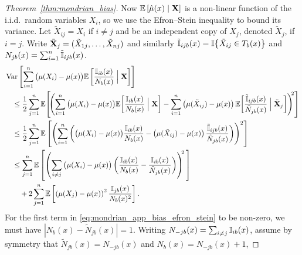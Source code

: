 \begin{proof}[Theorem~\ref{thm:mondrian_bias}]
  Now $\mathbb{E} \left[ \hat\mu(x) \mid \mathbf{X} \right]$
  is a non-linear function of the i.i.d.\ random variables $X_i$,
  so we use the Efron--Stein inequality
  \citep{efron1981jackknife} to bound its variance.
  Let $\tilde X_{i j} = X_i$ if $i \neq j$ and be an
  independent copy of $X_j$, denoted $\tilde X_j$, if $i = j$.
  Write $\tilde {\mathbf{X}}_j = (\tilde X_{1j}, \ldots, \tilde X_{n j})$
  and similarly
  $\tilde {\mathbb{I}}_{i j b}(x) = \mathbb{I} \big\{ \tilde X_{i j} \in T_b(x) \big\}$
  and $N_{j b}(x) = \sum_{i=1}^{n} \tilde {\mathbb{I}}_{i j b}(x)$.
  \begin{align}
    \nonumber
    &\Var \left[
      \sum_{i=1}^{n}
      \big( \mu(X_i) - \mu(x) \big)
      \E \left[
        \frac{\I_{i b}(x)}{N_b(x)}
        \Bigm| \bX
      \right]
    \right] \\
    \nonumber
    &\quad\leq
    \frac{1}{2}
    \sum_{j=1}^{n}
    \E \! \left[
      \! \left(
        \sum_{i=1}^{n}
        \big( \mu(X_i) - \mu(x) \big)
        \E \! \left[
          \frac{\I_{i b}(x)}{N_b(x)}
          \Bigm| \bX
        \right]
        - \sum_{i=1}^{n}
        \left( \mu(\tilde X_{i j}) - \mu(x) \right)
        \E \! \left[
          \frac{\tilde \I_{i j b}(x)}{\tilde N_{j b}(x)}
          \Bigm| \tilde \bX_j
        \right]
      \right)^{\! \! 2}
    \right] \\
    \nonumber
    &\quad\leq
    \frac{1}{2}
    \sum_{j=1}^{n}
    \E \left[
      \left(
        \sum_{i=1}^{n}
        \left(
          \big( \mu(X_i) - \mu(x) \big)
          \frac{\I_{i b}(x)}{N_b(x)}
          - \left( \mu(\tilde X_{i j}) - \mu(x) \right)
          \frac{\tilde \I_{i j b}(x)}{\tilde N_{j b}(x)}
        \right)
      \right)^2
    \right] \\
    \nonumber
    &\quad\leq
    \sum_{j=1}^{n}
    \E \left[
      \left(
        \sum_{i \neq j}
        \big( \mu(X_i) - \mu(x) \big)
        \left(
          \frac{\I_{i b}(x)}{N_b(x)} - \frac{\I_{i b}(x)}{\tilde N_{j b}(x)}
        \right)
      \right)^{\!\!2} \,
    \right] \\
    \label{eq:mondrian_app_bias_efron_stein}
    &\qquad+
    2 \sum_{j=1}^{n}
    \E \left[
      \left( \mu(X_j) - \mu(x) \right)^2
      \frac{\I_{j b}(x)}{N_b(x)^2}
    \right].
  \end{align}
  For the first term in \eqref{eq:mondrian_app_bias_efron_stein} to be non-zero,
  we must have $|N_b(x) - \tilde N_{j b}(x)| = 1$.
  Writing $N_{-j b}(x) = \sum_{i \neq j} \mathbb{I}_{i b}(x)$,
  assume by symmetry that
  $\tilde N_{j b}(x) = N_{-j b}(x)$ and $N_b(x) = N_{-j b}(x) + 1$,

\end{proof}
